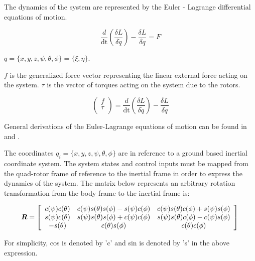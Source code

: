 \noindent The dynamics of the system are represented by the Euler - Lagrange differential equations of motion.

\begin{equation}
    \frac{d}{\text{dt}} \left( \frac{\delta  L} {\delta \dot{q}}\right) - \frac{\delta  L}{\delta q}=F 
\end{equation}


$ q = \{x,y,z,\psi ,\theta ,\phi \} = \{ \xi , \eta \}  $.


\noindent  $ f $ is the generalized force vector representing the linear external force acting on the system. 
$\tau $ is the vector of torques acting on the system due to the rotors.

\begin{equation}
    \left( \begin{array}{c} f \\ \tau \\ \end{array} \right) = \frac{d}{\text{dt}} \left( \frac{\delta  L} {\delta \dot{q}}\right) - \frac{\delta  L}{\delta q}
\end{equation}

General derivations of the Euler-Lagrange equations of motion can be found in \cite{marion1995classical} and  \cite{cornelius1970variational}. 

The coordinates  $ q_i=\{x,y,z,\psi ,\theta ,\phi \} $  are in reference to a ground based inertial coordinate system. The system states and control inputs must be mapped from the quad-rotor frame of reference to the inertial frame in order to express the dynamics of the system. The matrix below represents an arbitrary rotation transformation from the body frame to the inertial frame is:

\begin{equation}
\boldsymbol R = \left[ \begin{array}{ccc}
c(\psi) c(\theta) & c(\psi) s(\theta) s(\phi) - s(\psi) c(\phi) & c(\psi) s(\theta) c(\phi) + s(\psi) s(\phi)\\
s(\psi) c(\theta) & s(\psi) s(\theta) s(\phi) + c(\psi) c(\phi) & s(\psi) s(\theta) c(\phi) - c(\psi) s(\phi)\\
-s(\theta) & c(\theta) s(\phi) & c(\theta) c(\phi)\\
\end{array} \right]\\
\end{equation}

For simplicity, cos is denoted by 'c' and sin is denoted by 's' in the above expression. 





